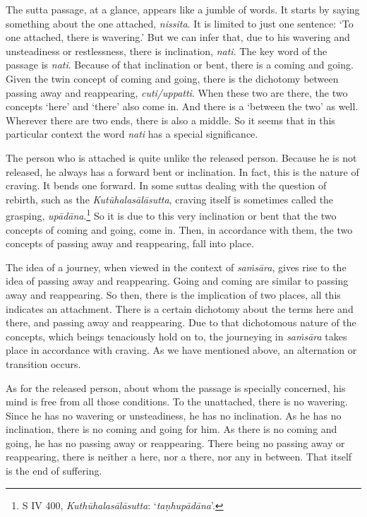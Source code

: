 The sutta passage, at a glance, appears like a jumble of words. It starts by saying something about the one attached, \emph{nissita}. It is limited to just one sentence: `To one attached, there is wavering.' But we can infer that, due to his wavering and unsteadiness or restlessness, there is inclination, \emph{nati}. The key word of the passage is \emph{nati}. Because of that inclination or bent, there is a coming and going. Given the twin concept of coming and going, there is the dichotomy between passing away and reappearing, \emph{cuti/uppatti}. When these two are there, the two concepts `here' and `there' also come in. And there is a `between the two' as well. Wherever there are two ends, there is also a middle. So it seems that in this particular context the word \emph{nati} has a special significance.

The person who is attached is quite unlike the released person. Because he is not released, he always has a forward bent or inclination. In fact, this is the nature of craving. It bends one forward. In some suttas dealing with the question of rebirth, such as the \emph{Kutūhalasālāsutta}, craving itself is sometimes called the grasping, \emph{upādāna}.\footnote{S IV 400, \emph{Kuthūhalasālāsutta}: `\emph{taṇhupādāna}'.} So it is due to this very inclination or bent that the two concepts of coming and going, come in. Then, in accordance with them, the two concepts of passing away and reappearing, fall into place.

The idea of a journey, when viewed in the context of \emph{saṁsāra}, gives rise to the idea of passing away and reappearing. Going and coming are similar to passing away and reappearing. So then, there is the implication of two places, all this indicates an attachment. There is a certain dichotomy about the terms here and there, and passing away and reappearing. Due to that dichotomous nature of the concepts, which beings tenaciously hold on to, the journeying in \emph{saṁsāra} takes place in accordance with craving. As we have mentioned above, an alternation or transition occurs.

As for the released person, about whom the passage is specially concerned, his mind is free from all those conditions. To the unattached, there is no wavering. Since he has no wavering or unsteadiness, he has no inclination. As he has no inclination, there is no coming and going for him. As there is no coming and going, he has no passing away or reappearing. There being no passing away or reappearing, there is neither a here, nor a there, nor any in between. That itself is the end of suffering.

